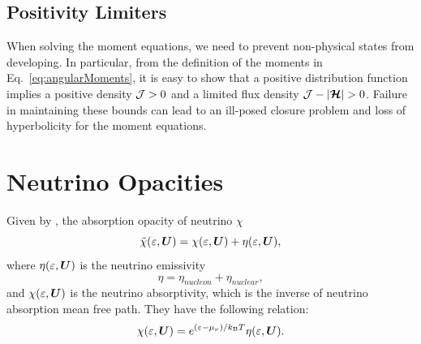 \documentclass[10pt,preprint]{aastex}
\newcommand{\ee}[1]{{\color{red} #1}}
\begin{document}
\subsection{Positivity Limiters}
\label{sec:positivityLimiters}

When solving the moment equations, we need to prevent non-physical states from developing.  
In particular, from the definition of the moments in Eq.~\eqref{eq:angularMoments}, it is easy to show that a positive distribution function implies a positive density $\mathcal{J}>0$ and a limited flux density $\cJ-|\bcH|>0$.  
Failure in maintaining these bounds can lead to an ill-posed closure problem and loss of hyperbolicity for the moment equations.  

\section{Neutrino Opacities}
\label{sec:opacities}


Given by \citet{bruenn_1985}, the absorption opacity of neutrino $\chi$ 
\begin{equation}
  \tilde{\chi}(\varepsilon,\boldsymbol{U}) = \chi(\varepsilon,\boldsymbol{U}) + \eta(\varepsilon,\boldsymbol{U}), 
\end{equation}
where $\eta(\varepsilon,\boldsymbol{U}) $ is the neutrino emissivity
\begin{equation}
\eta = \eta_{nucleon} + \eta_{nuclear},
\end{equation}  
and $ \chi(\varepsilon,\boldsymbol{U})$ is the neutrino absorptivity, which is the inverse of neutrino absorption mean free path.
They have the following relation:
\begin{equation}
\chi(\varepsilon,\boldsymbol{U}) = e^{(\varepsilon-\mu_{\nu})/k_{\mbox{\tiny B}}T} \eta(\varepsilon,\boldsymbol{U}). 
\end{equation}
\end{document}
